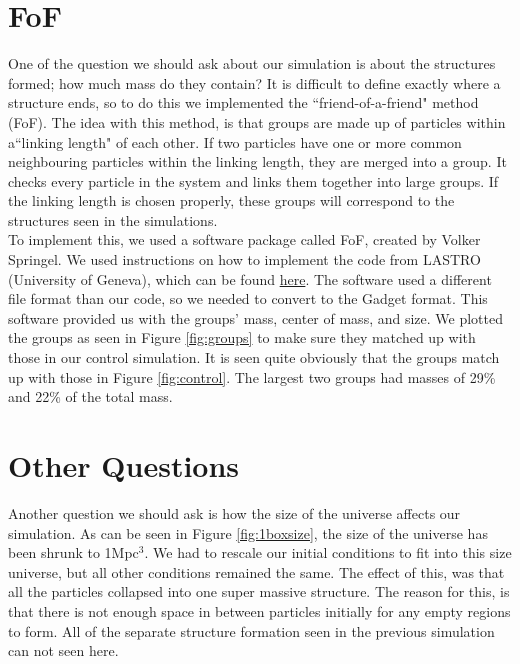 \documentclass[10pt]{article}
\begin{document}
	
	
\section{FoF}
	One of the question we should ask about our simulation is about the structures formed; how much mass do they contain? It is difficult to define exactly where a structure ends, so to do this we implemented the ``friend-of-a-friend" method (FoF). The idea with this method, is that groups are made up of particles within a``linking length" of each other. If two particles have one or more common neighbouring particles within the linking length, they are merged into a group. It checks every particle in the system and links them together into large groups. If the linking length is chosen properly, these groups will correspond to the structures seen in the simulations.\\
	To implement this, we used a software package called FoF, created by Volker Springel. We used instructions on how to implement the code from LASTRO (University of Geneva), which can be found \href{http://obswww.unige.ch/lastro/misc/TP4/doc/rst/Exercices/Ex05.html#extracting-haloes}{here}. The software used a different file format than our code, so we needed to convert to the Gadget format. This software provided us with the groups' mass, center of mass, and size. We plotted the groups as seen in Figure \ref{fig:groups}{} to make sure they matched up with those in our control simulation. It is seen quite obviously that the groups match up with those in Figure \ref{fig:control}. The largest two groups had masses of 29\% and 22\% of the total mass.


\section{Other Questions}
	Another question we should ask is how the size of the universe affects our simulation. As can be seen in Figure \ref{fig:1boxsize}{}, the size of the universe has been shrunk to 1Mpc$^3$. We had to rescale our initial conditions to fit into this size universe, but all other conditions remained the same. The effect of this, was that all the particles collapsed into one super massive structure. The reason for this, is that there is not enough space in between particles initially for any empty regions to form. All of the separate structure formation seen in the previous simulation can not seen here.
\end{document}
